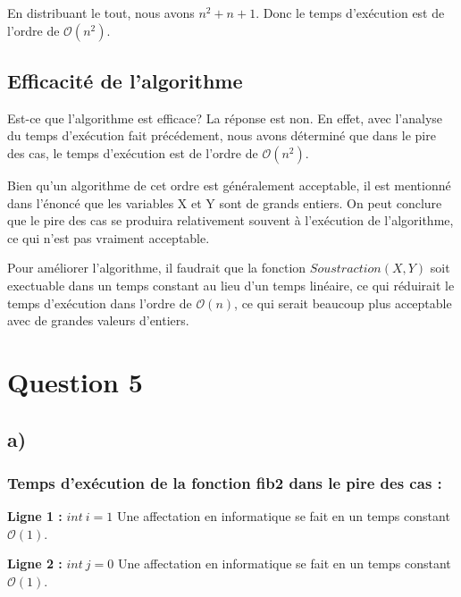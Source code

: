 \documentclass[12pt]{article}
\begin{document}
    \noindent En distribuant le tout, nous avons \( n ^ 2 + n + 1 \). Donc le
    temps d'exécution est de l'ordre de \( \mathcal{O}(n^2) \).

  \subsection*{Efficacité de l'algorithme}
   	Est-ce que l'algorithme est efficace? La réponse est non. En effet, avec
   	l'analyse du temps d'exécution fait précédement, nous avons déterminé
   	que dans le pire des cas, le temps d'exécution est de l'ordre
   	de \( \mathcal{O}(n^2) \). \newline

   	\noindent Bien qu'un algorithme de cet ordre est généralement acceptable,
   	il est mentionné dans l'énoncé que les variables X et Y sont de grands
   	entiers. On peut conclure que le pire des cas se produira relativement
   	souvent à l'exécution de l'algorithme, ce qui n'est pas vraiment
    acceptable. \newline

    \noindent Pour améliorer l'algorithme, il faudrait que la fonction
    \( Soustraction(X, Y) \) soit exectuable dans un temps constant au lieu d'un
    temps linéaire, ce qui réduirait le temps d'exécution dans l'ordre de
    \( \mathcal{O}(n) \), ce qui serait beaucoup plus acceptable avec de grandes
    valeurs d'entiers.

  \newpage

  \section*{Question 5}
  	\subsection*{a)}
  
  	  \subsubsection*{Temps d'exécution de la fonction fib2 dans le pire des cas :}
  	
  	    \noindent \textbf{Ligne 1 :} \( int \: i = 1 \) \newline
        Une affectation en informatique se fait en un temps constant
        \( \mathcal{O}(1) \). \newline

        \noindent \textbf{Ligne 2 :} \( int \: j = 0 \) \newline
        Une affectation en informatique se fait en un temps constant
        \( \mathcal{O}(1) \). \newline
\end{document}
